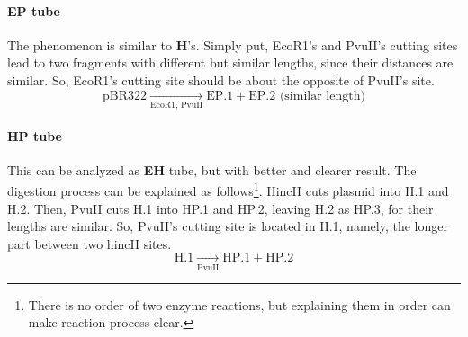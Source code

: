 \documentclass{article}
\begin{document}
                \paragraph{\textbf{EP} tube} The phenomenon is similar to \textbf{H}'s. Simply put, EcoR1's and PvuII's cutting sites lead to two fragments with different but similar lengths, since their distances are similar. So, EcoR1's cutting site should be about the opposite of PvuII's site.
                $$\text{pBR322}\underset{\text{EcoR1, PvuII}}{\rightarrow}\text{EP.1}+\text{EP.2} \text{ (similar length)}$$

                \paragraph{\textbf{HP} tube} This can be analyzed as \textbf{EH} tube, but with better and clearer result. The digestion process can be explained as follows\footnote{There is no order of two enzyme reactions, but explaining them in order can make reaction process clear.}. HincII cuts plasmid into H.1 and H.2. Then, PvuII cuts H.1 into HP.1 and HP.2, leaving H.2 as HP.3, for their lengths are similar. So, PvuII's cutting site is located in H.1, namely, the longer part between two hincII sites.
                $$\text{H.1}\underset{\text{PvuII}}{\rightarrow}\text{HP.1} + \text{HP.2}$$
\end{document}
